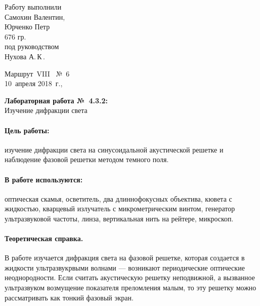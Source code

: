 \documentclass[12pt]{article}
\begin{document}
	\begin{minipage}{0.45\linewidth}
	Работу выполнили\\
	Самохин Валентин,\\
	Юрченко Петр\\ 676 гр.\\[2mm]
	под руководством\\
	Нухова А.\,К\,.
	\end{minipage}
	\hfill
	\begin{minipage}{0.45\linewidth}\flushright
		Маршрут~VIII \ №~6\\[3mm]
		10~апреля 2018~г.,\\
		\end{minipage}
		
		\vspace{8mm}
		\begin{center}
			\textbf{\Large Лабораторная работа №~4.3.2:}\\[\parskip]
			\LARGE Изучение дифракции света
			\end{center}
			\vspace{0mm}
			\paragraph{Цель работы:}
	изучение дифракции света на синусоидальной акустической решетке и наблюдение фазовой решетки методом темного поля.
				

			
			\paragraph{В работе используются:}
			оптическая скамья, осветитель, два длиннофокусных объектива, кювета с жидкостью, кварцевый излучатель с микрометрическим винтом, генератор ультразвуковой частоты, линза, вертикальная нить на рейтере, микроскоп.
			
			
			
			\vspace{2\parskip}
		\paragraph{Теоретическая справка.}
		 В работе изучается дифракция света на фазовой решетке, которая создается в жидкости ультразвукрвыми волнами --- возникают периодические оптические неоднородности. Если считать акустическую решетку неподвижной, а вызванное ультразвуком возмущение показателя преломления малым, то эту решетку можно рассматривать как тонкий фазовый экран. 
		 
\end{document}
